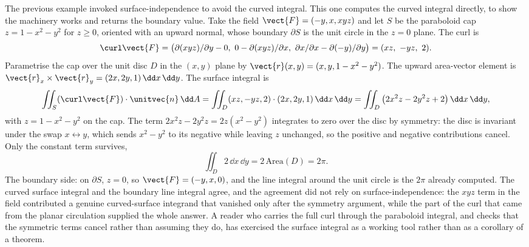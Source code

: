 \begin{example}
The previous example invoked surface-independence to avoid the curved
integral. This one computes the curved integral directly, to show the
machinery works and returns the boundary value. Take the field
$\vect{F} = (-y, x, xyz)$ and let $S$ be the paraboloid cap
$z = 1 - x^{2} - y^{2}$ for $z \geq 0$, oriented with an upward
normal, whose boundary $\partial S$ is the unit circle in the
$z = 0$ plane. The curl is
\[
\curl\vect{F} = \big(\partial(xyz)/\partial y - 0,\ 0 -
\partial(xyz)/\partial x,\ \partial x/\partial x - \partial(-y)/
\partial y\big) = (xz,\ -yz,\ 2).
\]
Parametrise the cap over the unit disc $D$ in the $(x, y)$ plane by
$\vect{r}(x, y) = (x, y, 1 - x^{2} - y^{2})$. The upward area-vector
element is $\vect{r}_{x}\times\vect{r}_{y} = (2x, 2y, 1)\,\dd x\,\dd y$.
The surface integral is
\[
\iint_{S}(\curl\vect{F})\cdot\unitvec{n}\,\dd A = \iint_{D}(xz, -yz, 2)
\cdot(2x, 2y, 1)\,\dd x\,\dd y = \iint_{D}\big(2x^{2}z - 2y^{2}z + 2
\big)\,\dd x\,\dd y,
\]
with $z = 1 - x^{2} - y^{2}$ on the cap. The term $2x^{2}z - 2y^{2}z =
2z(x^{2} - y^{2})$ integrates to zero over the disc by symmetry: the
disc is invariant under the swap $x \leftrightarrow y$, which sends
$x^{2} - y^{2}$ to its negative while leaving $z$ unchanged, so the
positive and negative contributions cancel. Only the constant term
survives,
\[
\iint_{D}2\,\dd x\,\dd y = 2\,\text{Area}(D) = 2\pi.
\]
The boundary side: on $\partial S$, $z = 0$, so $\vect{F} = (-y, x, 0)$,
and the line integral around the unit circle is the $2\pi$ already
computed. The curved surface integral and the boundary line integral
agree, and the agreement did not rely on surface-independence: the
$xyz$ term in the field contributed a genuine curved-surface integrand
that vanished only after the symmetry argument, while the part of the
curl that came from the planar circulation supplied the whole answer.
A reader who carries the full curl through the paraboloid integral, and
checks that the symmetric terms cancel rather than assuming they do,
has exercised the surface integral as a working tool rather than as a
corollary of a theorem.
\end{example}

